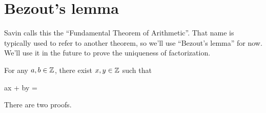 \section{Bezout's lemma}

Savin calls this the ``Fundamental Theorem of Arithmetic''. That name
is typically used to refer to another theorem, so we'll use ``Bezout's
lemma'' for now. We'll use it in the future to prove the uniqueness of
factorization.

\begin{lemma}
  \label{bezout}
  For any $a, b \in \mathbb{Z}$, there exist $x, y \in \mathbb{Z}$ such that

  \begin{zz}
    ax + by = 
  \end{zz}
\end{lemma}

There are two proofs.

